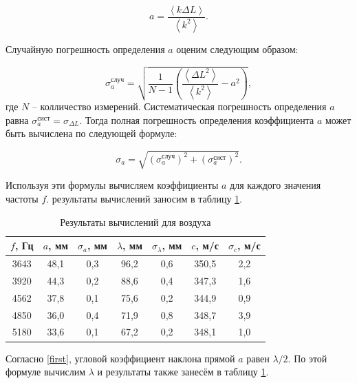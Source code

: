 \documentclass[a4paper,12pt]{article}
\theoremstyle{definition}
\begin{document}
	\begin{equation}\label{mnk:a}
		a=\frac{\left\langle k\Delta L \right\rangle}{\left\langle k^2 \right\rangle}.
	\end{equation}
	

	
	Случайную погрешность определения $ a $ оценим следующим образом:
	
	\begin{equation}\label{mnk:sigma_a}
		\sigma^\text{случ}_a=\sqrt{\frac{1}{N-1}\left(\frac{\left\langle \Delta L^2 \right\rangle}{\left\langle k^2 \right\rangle}-a^2\right)},
	\end{equation}
	где $ N $ -- колличество измерений. Систематическая погрешность определения $ a $ равна $ \sigma_a^\text{сист} = \sigma_{\Delta L} $. Тогда полная погрешность определения коэффициента $ a $ может быть вычислена по следующей формуле:
	
	\begin{equation}\label{mnk:full_sigma}
		\sigma_a=\sqrt{\left(\sigma^\text{случ}_a\right)^2+\left(\sigma^\text{сист}_a\right)^2}.
	\end{equation}
	
	Используя эти формулы вычисляем коэффициенты $ a $ для каждого значения частоты $ f $. результаты вычислений заносим в таблицу \ref{tab:resO2}.
	
	\begin{table}[H]
		\centering
		\begin{tabular}{|c|c|c|c|c|c|c|}
			\hline
			$ f $, Гц & $ a $, мм & $ \sigma_a $, мм & $ \lambda $, мм & $ \sigma_\lambda $, мм & $ c $, м/с & $ \sigma_c $, м/с \\ \hline
			3643 & 48,1 & 0,3 & 96,2 & 0,6 & 350,5 & 2,2 \\ \hline
			3920 & 44,3 & 0,2 & 88,6 & 0,4 & 347,3 & 1,6 \\ \hline
			4562 & 37,8 & 0,1 & 75,6 & 0,2 & 344,9 & 0,9 \\ \hline
			4850 & 36,0 & 0,4 & 71,9 & 0,8 & 348,7 & 3,9 \\ \hline
			5180 & 33,6 & 0,1 & 67,2 & 0,2 & 348,1 & 1,0 \\ \hline
		\end{tabular}
		\caption{Результаты вычислений для воздуха}
		\label{tab:resO2}
	\end{table}
	
	Согласно \eqref{first}, угловой коэффициент наклона прямой $ a $ равен $ \lambda/2 $. По этой формуле вычислим $ \lambda $ и результаты также занесём в таблицу \ref{tab:resO2}.
	
\end{document}
